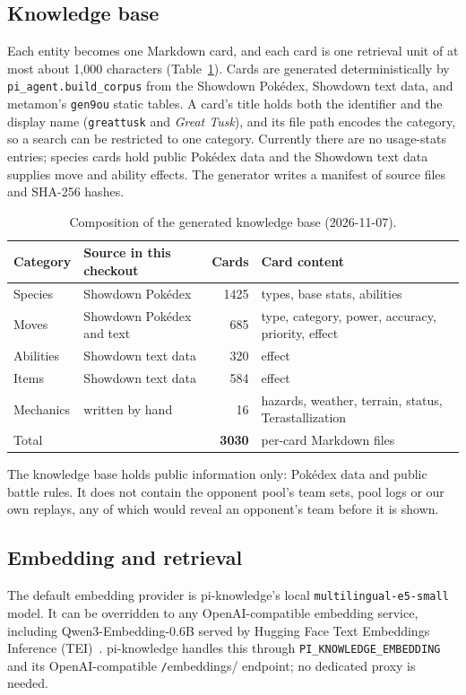 \documentclass[11pt,a4paper]{article}
\newcommand{\code}[1]{\texttt{#1}}
\begin{document}
\subsection{Knowledge base}
Each entity becomes one Markdown card, and each card is one retrieval unit of at most about 1{,}000
characters (Table~\ref{tab:kb}). Cards are generated deterministically by \code{pi\_agent.build\_corpus}
from the Showdown Pok\'edex, Showdown text data, and metamon's \code{gen9ou} static tables. A card's title
holds both the identifier and the display name (\code{greattusk} and \emph{Great Tusk}), and its file path
encodes the category, so a search can be restricted to one category. Currently there are no usage-stats
entries; species cards hold public Pok\'edex data and the Showdown text data supplies move and ability
effects. The generator writes a manifest of source files and SHA-256 hashes.

\begin{table}[t]
\centering
\small
\caption{Composition of the generated knowledge base (2026-11-07).}
\label{tab:kb}
\begin{tabularx}{\textwidth}{@{}l >{\raggedright\arraybackslash}X r >{\raggedright\arraybackslash}X@{}}
\toprule
\textbf{Category} & \textbf{Source in this checkout} & \textbf{Cards} & \textbf{Card content} \\
\midrule
Species   & Showdown Pok\'edex & 1425 & types, base stats, abilities \\
Moves     & Showdown Pok\'edex and text & 685 & type, category, power, accuracy, priority, effect \\
Abilities & Showdown text data & 320 & effect \\
Items     & Showdown text data & 584 & effect \\
Mechanics & written by hand & 16 & hazards, weather, terrain, status, Terastallization \\
\midrule
Total     &  & \textbf{3030} & per-card Markdown files \\
\bottomrule
\end{tabularx}
\end{table}

The knowledge base holds public information only: Pok\'edex data and public battle rules. It does not
contain the opponent pool's team sets, pool logs or our own replays, any of which would reveal an
opponent's team before it is shown.

\subsection{Embedding and retrieval}
The default embedding provider is pi-knowledge's local \code{multilingual-e5-small} model. It can be
overridden to any OpenAI-compatible embedding service, including Qwen3-Embedding-0.6B served by
Hugging Face Text Embeddings Inference (TEI)~\cite{tei}. pi-knowledge handles this through
\code{PI\_KNOWLEDGE\_EMBEDDING} and its OpenAI-compatible \code/embeddings/ endpoint; no dedicated proxy
is needed.
\end{document}
